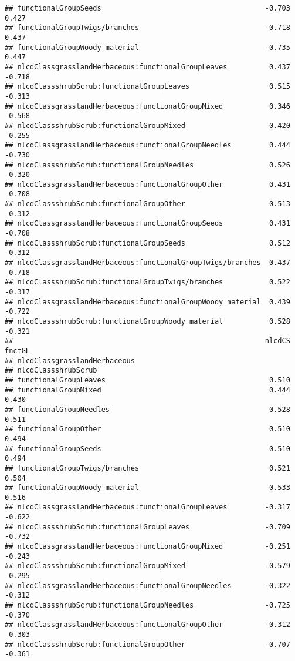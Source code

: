 \documentclass[]{article}
\begin{document}
\begin{verbatim}
## functionalGroupSeeds                                       -0.703  0.427
## functionalGroupTwigs/branches                              -0.718  0.437
## functionalGroupWoody material                              -0.735  0.447
## nlcdClassgrasslandHerbaceous:functionalGroupLeaves          0.437 -0.718
## nlcdClassshrubScrub:functionalGroupLeaves                   0.515 -0.313
## nlcdClassgrasslandHerbaceous:functionalGroupMixed           0.346 -0.568
## nlcdClassshrubScrub:functionalGroupMixed                    0.420 -0.255
## nlcdClassgrasslandHerbaceous:functionalGroupNeedles         0.444 -0.730
## nlcdClassshrubScrub:functionalGroupNeedles                  0.526 -0.320
## nlcdClassgrasslandHerbaceous:functionalGroupOther           0.431 -0.708
## nlcdClassshrubScrub:functionalGroupOther                    0.513 -0.312
## nlcdClassgrasslandHerbaceous:functionalGroupSeeds           0.431 -0.708
## nlcdClassshrubScrub:functionalGroupSeeds                    0.512 -0.312
## nlcdClassgrasslandHerbaceous:functionalGroupTwigs/branches  0.437 -0.718
## nlcdClassshrubScrub:functionalGroupTwigs/branches           0.522 -0.317
## nlcdClassgrasslandHerbaceous:functionalGroupWoody material  0.439 -0.722
## nlcdClassshrubScrub:functionalGroupWoody material           0.528 -0.321
##                                                            nlcdCS fnctGL
## nlcdClassgrasslandHerbaceous                                            
## nlcdClassshrubScrub                                                     
## functionalGroupLeaves                                       0.510       
## functionalGroupMixed                                        0.444  0.430
## functionalGroupNeedles                                      0.528  0.511
## functionalGroupOther                                        0.510  0.494
## functionalGroupSeeds                                        0.510  0.494
## functionalGroupTwigs/branches                               0.521  0.504
## functionalGroupWoody material                               0.533  0.516
## nlcdClassgrasslandHerbaceous:functionalGroupLeaves         -0.317 -0.622
## nlcdClassshrubScrub:functionalGroupLeaves                  -0.709 -0.732
## nlcdClassgrasslandHerbaceous:functionalGroupMixed          -0.251 -0.243
## nlcdClassshrubScrub:functionalGroupMixed                   -0.579 -0.295
## nlcdClassgrasslandHerbaceous:functionalGroupNeedles        -0.322 -0.312
## nlcdClassshrubScrub:functionalGroupNeedles                 -0.725 -0.370
## nlcdClassgrasslandHerbaceous:functionalGroupOther          -0.312 -0.303
## nlcdClassshrubScrub:functionalGroupOther                   -0.707 -0.361

\end{verbatim}
\end{document}
